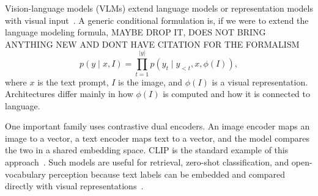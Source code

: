 

Vision-language models (VLMs) extend language models or representation models with visual input~\cite[2--3]{zhou_large_2026}. A generic conditional formulation is, if we were to extend the language modeling formula, MAYBE DROP IT, DOES NOT BRING ANYTHING NEW AND DONT HAVE CITATION FOR THE FORMALISM
\[
p(y\mid x,I)
=
\prod_{t=1}^{|y|}
p(y_t\mid y_{<t},x,\phi(I)),
\]
where \(x\) is the text prompt, \(I\) is the image, and \(\phi(I)\) is a visual representation. Architectures differ mainly in how \(\phi(I)\) is computed and how it is connected to language.

One important family uses contrastive dual encoders. An image encoder maps an image to a vector, a text encoder maps text to a vector, and the model compares the two in a shared embedding space. CLIP is the standard example of this approach~\cite{pmlr-v139-radford21a}. Such models are useful for retrieval, zero-shot classification, and open-vocabulary perception because text labels can be embedded and compared directly with visual representations~\cite[4--6]{zhou_large_2026}.

